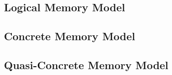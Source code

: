 \subsection{Logical Memory Model}
\begin{frame}{\subsecname}

\end{frame}

\subsection{Concrete Memory Model}
\begin{frame}{\subsecname}

\end{frame}

\subsection{Quasi-Concrete Memory Model}
\begin{frame}{\subsecname}

\end{frame}
